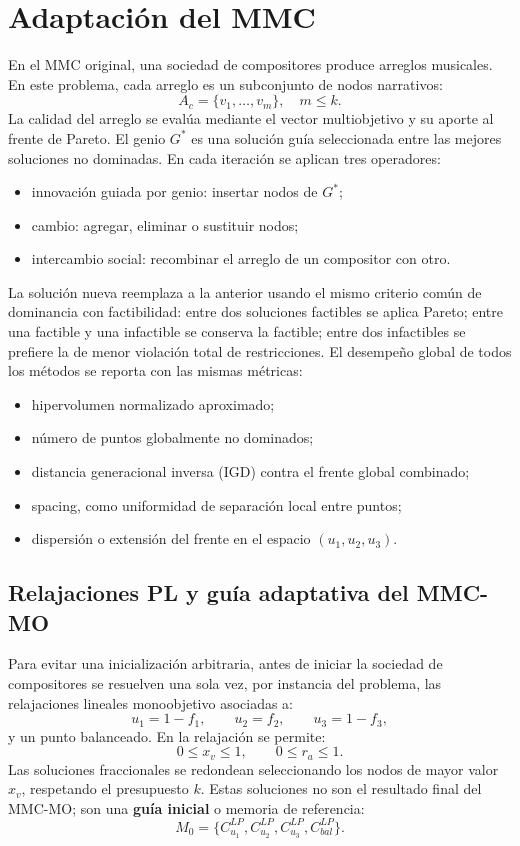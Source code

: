 \documentclass[11pt]{article}
\begin{document}
\section{Adaptación del MMC}

En el MMC original, una sociedad de compositores produce arreglos musicales. En
este problema, cada arreglo es un subconjunto de nodos narrativos:
\[
A_c=\{v_1,\ldots,v_m\},\quad m\leq k.
\]
La calidad del arreglo se evalúa mediante el vector multiobjetivo y su aporte al
frente de Pareto. El genio $G^*$ es una solución guía seleccionada entre las
mejores soluciones no dominadas. En cada iteración se aplican tres operadores:

\begin{itemize}
  \item innovación guiada por genio: insertar nodos de $G^*$;
  \item cambio: agregar, eliminar o sustituir nodos;
  \item intercambio social: recombinar el arreglo de un compositor con otro.
\end{itemize}

La solución nueva reemplaza a la anterior usando el mismo criterio común de
dominancia con factibilidad:
entre dos soluciones factibles se aplica Pareto; entre una factible y una
infactible se conserva la factible; entre dos infactibles se prefiere la de
menor violación total de restricciones. El desempeño global de todos los métodos
se reporta con las mismas métricas:
\begin{itemize}
  \item hipervolumen normalizado aproximado;
  \item número de puntos globalmente no dominados;
  \item distancia generacional inversa (IGD) contra el frente global combinado;
  \item spacing, como uniformidad de separación local entre puntos;
  \item dispersión o extensión del frente en el espacio \((u_1,u_2,u_3)\).
\end{itemize}

\subsection{Relajaciones PL y guía adaptativa del MMC-MO}

Para evitar una inicialización arbitraria, antes de iniciar la sociedad de
compositores se resuelven una sola vez, por instancia del problema, las
relajaciones lineales monoobjetivo asociadas a:
\[
u_1=1-f_1,\qquad u_2=f_2,\qquad u_3=1-f_3,
\]
y un punto balanceado. En la relajación se permite:
\[
0\leq x_v\leq 1,\qquad 0\leq r_a\leq 1.
\]
Las soluciones fraccionales se redondean seleccionando los nodos de mayor valor
\(x_v\), respetando el presupuesto \(k\). Estas soluciones no son el resultado
final del MMC-MO; son una \textbf{guía inicial} o memoria de referencia:
\[
M_0=\{C^{LP}_{u_1},C^{LP}_{u_2},C^{LP}_{u_3},C^{LP}_{bal}\}.
\]
\end{document}

